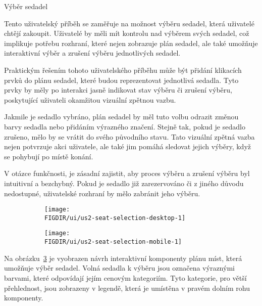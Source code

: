 \begin{subsection}{Výběr sedadel}
    \label{subsec:narvh-ui-transformace-uzivatelskych-pribehu-vyber-sedadel}
    \userstoryseatselection

    Tento uživatelský příběh se zaměřuje na možnost výběru sedadel, která uživatelé chtějí zakoupit.
    Uživatelé by měli mít kontrolu nad výběrem svých sedadel, což implikuje potřebu rozhraní, které nejen zobrazuje plán sedadel, ale také umožňuje interaktivní výběr a zrušení výběru jednotlivých sedadel.

    Praktickým řešením tohoto uživatelského příběhu může být přidání klikacích prvků do plánu sedadel, které budou reprezentovat jednotlivá sedadla.
    Tyto prvky by měly po interakci jasně indikovat stav výběru či zrušení výběru, poskytující uživateli okamžitou vizuální zpětnou vazbu.

    Jakmile je sedadlo vybráno, plán sedadel by měl tuto volbu odrazit změnou barvy sedadla nebo přidáním výrazného značení.
    Stejně tak, pokud je sedadlo zrušeno, mělo by se vrátit do svého původního stavu.
    Tato vizuální zpětná vazba nejen potvrzuje akci uživatele, ale také jim pomáhá sledovat jejich výběry, když se pohybují po místě konání.

    V otázce funkčnosti, je zásadní zajistit, aby proces výběru a zrušení výběru byl intuitivní a bezchybný.
    Pokud je sedadlo již zarezervováno či z jiného důvodu nedostupné, uživatelské rozhraní by mělo zabránit jeho výběru.

    \begin{figure}[H]
        \centering
        \caption{Návrh komponent pro výběr sedadel}
        \begin{subfigure}{0.775\textwidth}
            \texttt{[image: \\FIGDIR/ui/us2-seat-selection-desktop-1]}
            \label{fig:us2-seat-selection-desktop-1}
        \end{subfigure}
        \begin{subfigure}{0.2\textwidth}
            \texttt{[image: \\FIGDIR/ui/us2-seat-selection-mobile-1]}
            \label{fig:us2-seat-selection-mobile-1}
        \end{subfigure}
        \source{}
        \label{fig:us2-seat-selection}
    \end{figure}

    Na obrázku~\ref{fig:us2-seat-selection} je vyobrazen návrh interaktivní komponenty plánu míst, která umožňuje výběr sedadel.
    Volná sedadla k výběru jsou označena výraznými barvami, které odpovídají jejím cenovým kategoriím.
    Tyto kategorie, pro větší přehlednost, jsou zobrazeny v legendě, která je umístěna v pravém dolním rohu komponenty.


\end{subsection}
